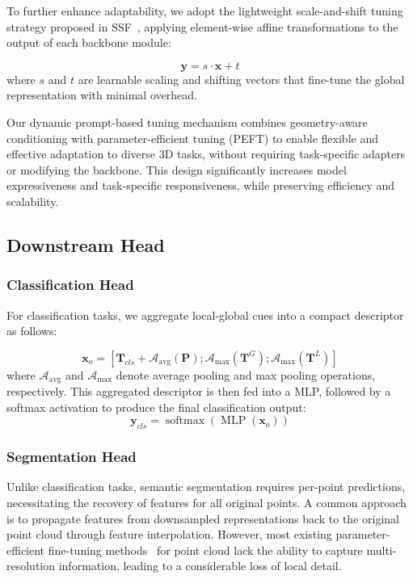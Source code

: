 To further enhance adaptability, we adopt the lightweight scale-and-shift tuning strategy proposed in SSF~\cite{lian2022scaling}, applying element-wise affine transformations to the output of each backbone module:

\begin{equation}
	\mathbf{y} = s \cdot \mathbf{x} + t
\end{equation}
where $s$ and $t$ are learnable  scaling and shifting  vectors that fine-tune the global representation with minimal overhead.

Our dynamic prompt-based tuning mechanism combines geometry-aware conditioning with parameter-efficient tuning (PEFT) to enable flexible and effective adaptation to diverse 3D tasks, without requiring task-specific adapters or modifying the backbone. This design significantly increases model expressiveness and task-specific responsiveness, while preserving efficiency and scalability.

\subsection{Downstream Head}
\label{sec:head}

\subsubsection{Classification Head}
For classification tasks, we aggregate local-global cues into a compact descriptor as follows:

\begin{equation}
\mathbf{x}_o = [\mathbf{T}_{cls} + \mathcal{A}_{\text{avg}}(\mathbf{P}); \mathcal{A}_{\text{max}}(\mathbf{T}^{G}); \mathcal{A}_{\text{max}}(\mathbf{T}^{L})]
\end{equation}
where $\mathcal{A}_{\text{avg}}$ and $\mathcal{A}_{\text{max}}$ denote average pooling and max pooling operations, respectively. This aggregated descriptor is then fed into a MLP, followed by a softmax activation to produce the final classification output:
\begin{equation}
\mathbf{y}_{cls} = \operatorname{softmax}(\operatorname{MLP}(\mathbf{x}_o))
\label{eq:MLP}
\end{equation}


\subsubsection{Segmentation Head}
Unlike classification tasks, semantic segmentation requires per-point predictions, necessitating the recovery of features for all original points. A common approach is to propagate features from downsampled representations back to the original point cloud through feature interpolation. However, most existing parameter-efficient fine-tuning methods~\cite{zha2023instance,zhou2024dynamic,liang2024parameter} for point cloud lack the ability to capture multi-resolution information, leading to a considerable loss of local detail.

